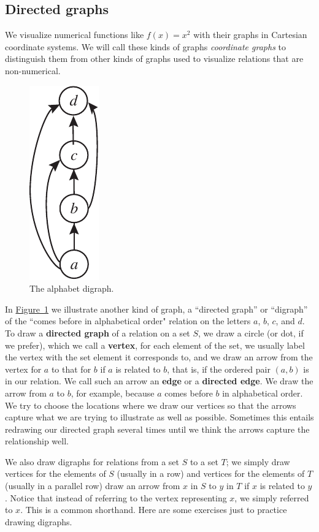 \documentclass[10pt,]{book}
\newcommand{\terminology}[1]{\textbf{#1}}
\theoremstyle{plain}
\theoremstyle{definition}
\theoremstyle{definition}
\numberwithin{equation}{chapter}
\begin{document}
\subsection[{Directed graphs}]{Directed graphs}\label{relationdigraph}
We visualize numerical functions like \(f(x)=x^2\) with their graphs in Cartesian coordinate systems. We will call these kinds of graphs \emph{coordinate graphs} to distinguish them from other kinds of graphs used to visualize relations that are non-numerical.%
\begin{figure}
\centering
\includegraphics[width=0.1\linewidth]{images/alphabetdigraph}
\caption{The alphabet digraph.\label{alphabetdigraph}}
\end{figure}
In \hyperref[alphabetdigraph]{Figure~\ref{alphabetdigraph}} we illustrate another kind of graph, a ``directed graph'' or ``digraph'' of the ``comes before in alphabetical order" relation on the letters \(a\), \(b\), \(c\), and \(d\). To draw a \terminology{directed graph} of a relation on a set \(S\), we draw a circle (or dot, if we prefer), which we call a \terminology{vertex}, for each element of the set, we usually label the vertex with the set element it corresponds to, and we draw an arrow from the vertex for \(a\) to that for \(b\) if \(a\) is related to \(b\), that is, if the ordered pair \((a,b)\) is in our relation. We call such an arrow an \terminology{edge} or a \terminology{directed edge}. We draw the arrow from \(a\) to \(b\), for example, because \(a\) comes before \(b\) in alphabetical order. We try to choose the locations where we draw our vertices so that the arrows capture what we are trying to illustrate as well as possible. Sometimes this entails redrawing our directed graph several times until we think the arrows capture the relationship well.%
\par
We also draw digraphs for relations from a set \(S\) to a set \(T\); we simply draw vertices for the elements of \(S\) (usually in a row) and vertices for the elements of \(T\) (usually in a parallel row) draw an arrow from \(x\) in \(S\) to \(y\) in \(T\) if \(x\) is related to \(y\). Notice that instead of referring to the vertex representing \(x\), we simply referred to \(x\). This is a common shorthand. Here are some exercises just to practice drawing digraphs.%
\end{document}
